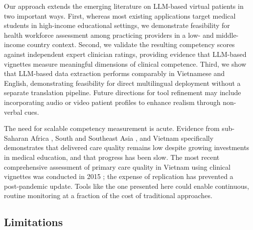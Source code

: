 \documentclass{article}
\begin{document}
Our approach extends the emerging literature on LLM-based virtual patients \citep{zeng2025embracing, cook2025virtual} in two important ways. First, whereas most existing applications target medical students in high-income educational settings, we demonstrate feasibility for health workforce assessment among practicing providers in a low- and middle-income country context. Second, we validate the resulting competency scores against independent expert clinician ratings, providing evidence that LLM-based vignettes measure meaningful dimensions of clinical competence. Third, we show that LLM-based data extraction performs comparably in Vietnamese and English, demonstrating feasibility for direct multilingual deployment without a separate translation pipeline. Future directions for tool refinement may include incorporating audio or video patient profiles to enhance realism through non-verbal cues.

The need for scalable competency measurement is acute. Evidence from sub-Saharan Africa \citep{daniels2024medical}, South and Southeast Asia \citep{das2022two, sassi2024impact, zhang2024quality, harrison2015patient}, and Vietnam specifically \citep{demombynes2016quality, zawahir2021standardised} demonstrates that delivered care quality remains low despite growing investments in medical education, and that progress has been slow. The most recent comprehensive assessment of primary care quality in Vietnam using clinical vignettes was conducted in 2015 \citep{demombynes2016quality}; the expense of replication has prevented a post-pandemic update. Tools like the one presented here could enable continuous, routine monitoring at a fraction of the cost of traditional approaches.

\subsection{Limitations}
\end{document}
